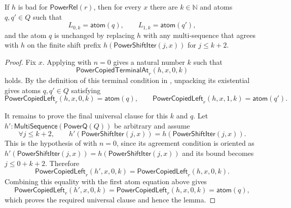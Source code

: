 \begin{lemma}
If $h$ is bad for $\mathsf{PowerRel}(r)$, then for every $x$ there are
$k\in\mathbb N$ and atoms $q,q'\in Q$ such that
\[
L_{0,k}=\mathsf{atom}(q),\qquad L_{1,k}=\mathsf{atom}(q'),
\]
and the atom $q$ is unchanged by replacing $h$ with any multi-sequence that
agrees with $h$ on the finite shift prefix
$h(\mathsf{PowerShiftIter}(j,x))$ for $j\le k+2$.
\end{lemma}
\begin{proof}
Fix $x$.  Applying  with $n=0$ gives a
natural number $k$ such that
\[
\mathsf{PowerCopiedTerminalAt}_r(h,x,0,k)
\]
holds.  By the definition of this terminal condition in
, unpacking its existential gives atoms
$q,q'\in Q$ satisfying
\[
\mathsf{PowerCopiedLeft}_r(h,x,0,k)=\mathsf{atom}(q),
\qquad
\mathsf{PowerCopiedLeft}_r(h,x,1,k)=\mathsf{atom}(q').
\]

It remains to prove the final universal clause for this $k$ and $q$.
Let $h':\mathsf{MultiSequence}(\mathsf{PowerQ}(Q))$ be arbitrary and
assume
\[
\forall j\leq k+2,\qquad
h'(\mathsf{PowerShiftIter}(j,x))
 =h(\mathsf{PowerShiftIter}(j,x)).
\]
This is the hypothesis of  with
$n=0$, since its agreement condition is oriented as
$h'(\mathsf{PowerShiftIter}(j,x))=h(\mathsf{PowerShiftIter}(j,x))$
and its bound becomes $j\leq 0+k+2$.  Therefore
\[
\mathsf{PowerCopiedLeft}_r(h',x,0,k)
 =\mathsf{PowerCopiedLeft}_r(h,x,0,k).
\]
Combining this equality with the first atom equation above gives
\[
\mathsf{PowerCopiedLeft}_r(h',x,0,k)
 =\mathsf{PowerCopiedLeft}_r(h,x,0,k)
 =\mathsf{atom}(q),
\]
which proves the required universal clause and hence the lemma.
\end{proof}
